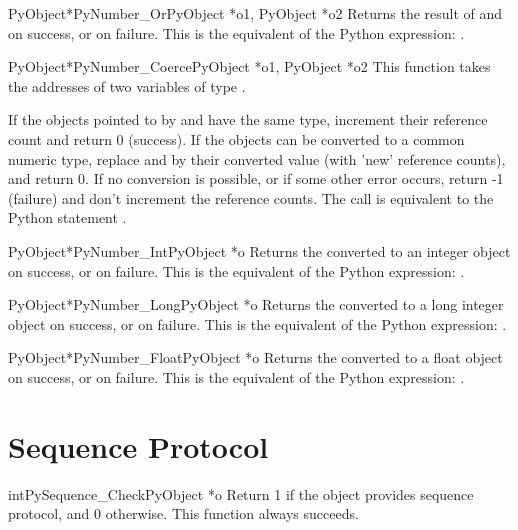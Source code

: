 \documentclass[twoside,openright]{report}
\begin{document}
\begin{cfuncdesc}{PyObject*}{PyNumber_Or}{PyObject *o1, PyObject *o2}
Returns the result of  and  on success, or \NULL{} on
failure.  This is the equivalent of the Python expression: 
.
\end{cfuncdesc}


\begin{cfuncdesc}{PyObject*}{PyNumber_Coerce}{PyObject *o1, PyObject *o2}
This function takes the addresses of two variables of type
.

If the objects pointed to by  and  have the same type,
increment their reference count and return 0 (success).
If the objects can be converted to a common numeric type,
replace  and  by their converted value (with 'new'
reference counts), and return 0.
If no conversion is possible, or if some other error occurs,
return -1 (failure) and don't increment the reference counts.
The call  is equivalent to the Python
statement .
\end{cfuncdesc}


\begin{cfuncdesc}{PyObject*}{PyNumber_Int}{PyObject *o}
Returns the  converted to an integer object on success, or
\NULL{} on failure.  This is the equivalent of the Python
expression: .
\end{cfuncdesc}


\begin{cfuncdesc}{PyObject*}{PyNumber_Long}{PyObject *o}
Returns the  converted to a long integer object on success,
or \NULL{} on failure.  This is the equivalent of the Python
expression: .
\end{cfuncdesc}


\begin{cfuncdesc}{PyObject*}{PyNumber_Float}{PyObject *o}
Returns the  converted to a float object on success, or \NULL{}
on failure.  This is the equivalent of the Python expression:
.
\end{cfuncdesc}


\section{Sequence Protocol}

\begin{cfuncdesc}{int}{PySequence_Check}{PyObject *o}
Return 1 if the object provides sequence protocol, and 0
otherwise.  
This function always succeeds.
\end{cfuncdesc}
\end{document}
